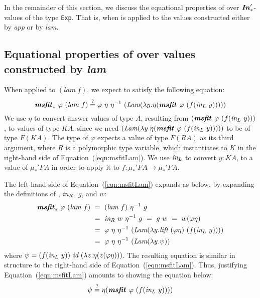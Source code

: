 In the remainder of this section, we discuss the equational properties
of \msfit{*} over $\textbf{\textit{In}}_{*}'$-values of the type \lstinline{Exp}. That is,
when \msfit{*} is applied to the values constructed either by \textit{app}
or by \textit{lam}.

\subsection{Equational properties of \msfit{*} over
	values constructed by \textit{lam}}
When applied to $(\textit{lam}~f)$, we expect \msfit{*} to
satisfy the following equation:
\begin{equation}
\textbf{\textit{msfit}}_{*}~\varphi~(\textit{lam}~f)
\stackrel{?}{=} \varphi~\eta~\eta^{-1}
	~(\textit{Lam}(\lambda y.\eta(\textbf{\textit{msfit}}_{~}\varphi~(f(\textit{in}_{L}~y)))))
\label{eqn:msfitLam}
\end{equation}
We use $\eta$ to convert answer values of type $A$, resulting from
$(\textbf{\textit{msfit}}_{~}\varphi~(f(\textit{in}_{L}~y)))$, to values of type $KA$, since we need
$(\textit{Lam}(\lambda y.\eta(\textbf{\textit{msfit}}_{~}\varphi~(f(\textit{in}_{L}~y)))))$
to be of type $F(KA)$. The type of $\varphi$ expects a value of type $F(RA)$
as its third argument, where $R$ is a polymorphic type variable, which
instantiates to $K$ in the right-hand side of Equation~(\ref{eqn:msfitLam}).
We use $\textit{in}_{L}$ to convert $y : KA$, to a value of $\mu_{*}' F A$
in order to apply it to $f : \mu_{*}' F A \to \mu_{*}' F A$.

The left-hand side of Equation~(\ref{eqn:msfitLam}) expands as below,
by expanding the definitions of \msfit{*}, $\textit{in}_{R}$, $g$, and  $w$:
\begin{align*}
\textbf{\textit{msfit}}_{*}~\varphi~(\textit{lam}~f)
&~=~ (\textit{lam}~f)~\eta^{-1}~g \\
&~=~ \textit{in}_{R}~w~\eta^{-1}~g ~=~ g~w ~=~ w(\varphi\eta) \\
&~=~ \varphi~\eta~\eta^{-1}~
	(\textit{Lam}(\lambda y.\textit{lift}~(\varphi\eta)~(f(\textit{in}_{L}~y)))) \\
&~=~ \varphi~\eta~\eta^{-1}~(\textit{Lam}(\lambda y.\psi))
\end{align*}
where $\psi = (f(\textit{in}_{L}~y))~\textit{id}~(\lambda z.\eta(z(\varphi\eta)))$.
The resulting equation is similar in structure to the right-hand side of
Equation~(\ref{eqn:msfitLam}). Thus, justifying Equation~(\ref{eqn:msfitLam})
amounts to showing the equation below:
\begin{equation}
\psi \stackrel{?}{=} \eta(\textbf{\textit{msfit}}_{~}\varphi~(f(\textit{in}_{L}~y))))
\label{eqn:msfitPsi}
\end{equation}

